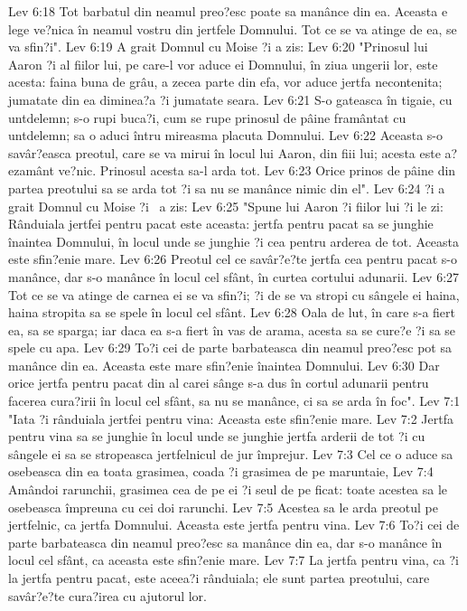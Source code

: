 Lev 6:18  Tot barbatul din neamul preo?esc poate sa manânce din ea. Aceasta e lege ve?nica în neamul vostru din jertfele Domnului. Tot ce se va atinge de ea, se va sfin?i".
Lev 6:19  A grait Domnul cu Moise ?i a zis:
Lev 6:20  "Prinosul lui Aaron ?i al fiilor lui, pe care-l vor aduce ei Domnului, în ziua ungerii lor, este acesta: faina buna de grâu, a zecea parte din efa, vor aduce jertfa necontenita; jumatate din ea diminea?a ?i jumatate seara.
Lev 6:21  S-o gateasca în tigaie, cu untdelemn; s-o rupi buca?i, cum se rupe prinosul de pâine framântat cu untdelemn; sa o aduci întru mireasma placuta Domnului.
Lev 6:22  Aceasta s-o savâr?easca preotul, care se va mirui în locul lui Aaron, din fiii lui; acesta este a?ezamânt ve?nic. Prinosul acesta sa-l arda tot.
Lev 6:23  Orice prinos de pâine din partea preotului sa se arda tot ?i sa nu se manânce nimic din el".
Lev 6:24  ?i a grait Domnul cu Moise ?i  a zis:
Lev 6:25  "Spune lui Aaron ?i fiilor lui ?i le zi: Rânduiala jertfei pentru pacat este aceasta: jertfa pentru pacat sa se junghie înaintea Domnului, în locul unde se junghie ?i cea pentru arderea de tot. Aceasta este sfin?enie mare.
Lev 6:26  Preotul cel ce savâr?e?te jertfa cea pentru pacat s-o manânce, dar s-o manânce în locul cel sfânt, în curtea cortului adunarii.
Lev 6:27  Tot ce se va atinge de carnea ei se va sfin?i; ?i de se va stropi cu sângele ei haina, haina stropita sa se spele în locul cel sfânt.
Lev 6:28  Oala de lut, în care s-a fiert ea, sa se sparga; iar daca ea s-a fiert în vas de arama, acesta sa se cure?e ?i sa se spele cu apa.
Lev 6:29  To?i cei de parte barbateasca din neamul preo?esc pot sa manânce din ea. Aceasta este mare sfin?enie înaintea Domnului.
Lev 6:30  Dar orice jertfa pentru pacat din al carei sânge s-a dus în cortul adunarii pentru facerea cura?irii în locul cel sfânt, sa nu se manânce, ci sa se arda în foc".
Lev 7:1  "Iata ?i rânduiala jertfei pentru vina: Aceasta este sfin?enie mare.
Lev 7:2  Jertfa pentru vina sa se junghie în locul unde se junghie jertfa arderii de tot ?i cu sângele ei sa se stropeasca jertfelnicul de jur împrejur.
Lev 7:3  Cel ce o aduce sa osebeasca din ea toata grasimea, coada ?i grasimea de pe maruntaie,
Lev 7:4  Amândoi rarunchii, grasimea cea de pe ei ?i seul de pe ficat: toate acestea sa le osebeasca împreuna cu cei doi rarunchi.
Lev 7:5  Acestea sa le arda preotul pe jertfelnic, ca jertfa Domnului. Aceasta este jertfa pentru vina.
Lev 7:6  To?i cei de parte barbateasca din neamul preo?esc sa manânce din ea, dar s-o manânce în locul cel sfânt, ca aceasta este sfin?enie mare.
Lev 7:7  La jertfa pentru vina, ca ?i la jertfa pentru pacat, este aceea?i rânduiala; ele sunt partea preotului, care savâr?e?te cura?irea cu ajutorul lor.
